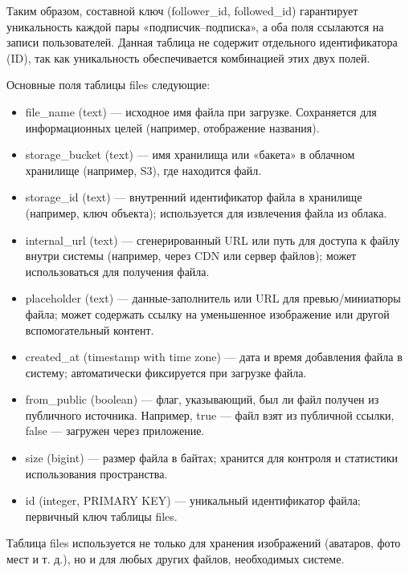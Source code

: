 Таким образом, составной ключ (follower\_id, followed\_id) гарантирует уникальность каждой пары «подписчик–подписка», а оба поля ссылаются на записи пользователей. Данная таблица не содержит отдельного идентификатора (ID), так как уникальность обеспечивается комбинацией этих двух полей.

Основные поля таблицы files следующие:
\begin{itemize}
    \item file\_name (text) — исходное имя файла при загрузке. Сохраняется для информационных целей (например, отображение названия).
    \item storage\_bucket (text) — имя хранилища или «бакета» в облачном хранилище (например, S3), где находится файл.
    \item storage\_id (text) — внутренний идентификатор файла в хранилище (например, ключ объекта); используется для извлечения файла из облака.
    \item internal\_url (text) — сгенерированный URL или путь для доступа к файлу внутри системы (например, через CDN или сервер файлов); может использоваться для получения файла.
    \item placeholder (text) — данные-заполнитель или URL для превью/миниатюры файла; может содержать ссылку на уменьшенное изображение или другой вспомогательный контент.
    \item created\_at (timestamp with time zone) — дата и время добавления файла в систему; автоматически фиксируется при загрузке файла.
    \item from\_public (boolean) — флаг, указывающий, был ли файл получен из публичного источника. Например, true — файл взят из публичной ссылки, false — загружен через приложение.
    \item size (bigint) — размер файла в байтах; хранится для контроля и статистики использования пространства.
    \item id (integer, PRIMARY KEY) — уникальный идентификатор файла; первичный ключ таблицы files.
\end{itemize}
\noindent Таблица files используется не только для хранения изображений (аватаров, фото мест и т. д.), но и для любых других файлов, необходимых системе.
